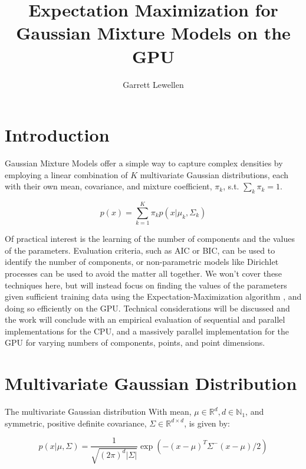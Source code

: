 \documentclass{article}
\begin{document}
\author{Garrett Lewellen}
\title{Expectation Maximization for Gaussian Mixture Models on the GPU}

\maketitle

\section{Introduction}

Gaussian Mixture Models \cite[435-439]{bishop2006} offer a simple way to capture complex densities by employing a linear combination of $K$ multivariate Gaussian distributions, each with their own mean, covariance, and mixture coefficient, $\pi_{k}$, s.t. $\sum_{k} \pi_{k} = 1$.

\begin{equation}
	p( x ) = \sum_{k = 1}^{K} \pi_{k} p(x \lvert \mu_k, \Sigma_k)
\end{equation}

Of practical interest is the learning of the number of components and the values of the parameters. Evaluation criteria, such as AIC or BIC, can be used to identify the number of components, or non-parametric models like Dirichlet processes can be used to avoid the matter all together. We won't cover these techniques here, but will instead focus on finding the values of the parameters given sufficient training data using the Expectation-Maximization algorithm \cite{dempster1977maximum}, and doing so efficiently on the GPU. Technical considerations will be discussed and the work will conclude with an empirical evaluation of sequential and parallel implementations for the CPU, and a massively parallel implementation for the GPU for varying numbers of components, points, and point dimensions.

\section{Multivariate Gaussian Distribution}

The multivariate Gaussian distribution With mean, $\mu \in \mathbb{R}^d, d \in \mathbb{N}_1$, and symmetric, positive definite covariance, $\Sigma \in \mathbb{R}^{d \times d}$, is given by:

\begin{equation}
	p( x \lvert \mu, \Sigma ) = \frac{1}{\sqrt{(2\pi)^d \lvert \Sigma \rvert }} \exp{\left( - (x - \mu)^{T} \Sigma^{-} (x - \mu) / 2 \right)}
	\label{eqn:mvn}
\end{equation}
\end{document}
